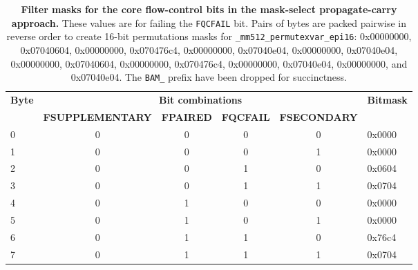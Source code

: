\begin{table}[]
\centering
\caption{\textbf{Filter masks for the core flow-control bits in the mask-select propagate-carry approach.} These values are for failing the \texttt{FQCFAIL} bit. Pairs of bytes are packed pairwise in reverse order to create 16-bit permutations masks for \texttt{\_mm512\_permutexvar\_epi16}: 0x00000000, 0x07040604, 0x00000000, 0x070476c4, 0x00000000, 0x07040e04, 0x00000000, 0x07040e04, 0x00000000, 0x07040604, 0x00000000, 0x070476c4, 0x00000000, 0x07040e04, 0x00000000, and 0x07040e04. The \texttt{BAM\_} prefix have been dropped for succinctness.}
\label{tab:mask-data-qc1}
\begin{tabular}{|l|c|c|c|c|l|}
\hline
\multirow{2}{*}{\textbf{Byte}} & \multicolumn{4}{c|}{\textbf{Bit combinations}}                                      & \multirow{2}{*}{\textbf{Bitmask}} \\ \cline{2-5}
                             & \textbf{FSUPPLEMENTARY} & \textbf{FPAIRED} & \textbf{FQCFAIL} & \textbf{FSECONDARY} &                                \\ \hline
0                            & 0                       & 0                & 0                & 0                   & 0x0000                         \\ \hline
1                            & 0                       & 0                & 0                & 1                   & 0x0000                         \\ \hline
2                            & 0                       & 0                & 1                & 0                   & 0x0604                         \\ \hline
3                            & 0                       & 0                & 1                & 1                   & 0x0704                         \\ \hline
4                            & 0                       & 1                & 0                & 0                   & 0x0000                         \\ \hline
5                            & 0                       & 1                & 0                & 1                   & 0x0000                         \\ \hline
6                            & 0                       & 1                & 1                & 0                   & 0x76c4                         \\ \hline
7                            & 0                       & 1                & 1                & 1                   & 0x0704                         \\ \hline

\end{tabular}
\end{table}
